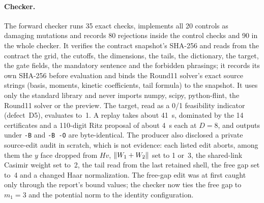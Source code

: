 \paragraph{Checker.}
The forward checker runs 35 exact checks, implements all 20 controls as
damaging mutations and records 80 rejections inside the control checks and
90 in the whole checker. It verifies the contract snapshot's SHA-256 and reads
from the contract the grid, the cutoffs, the dimensions, the tails, the
dictionary, the target, the gate fields, the mandatory sentence and the
forbidden phrasings; it records its own SHA-256 before evaluation and binds
the Round11 solver's exact source strings (basis, moments, kinetic
coefficients, tail formula) to the snapshot. It uses only the standard
library and never imports numpy, scipy, python-flint, the Round11 solver or
the preview. The target, read as a 0/1 feasibility indicator (defect~D5),
evaluates to~1. A replay takes about 41~s, dominated by the 14 certificates
and a 110-digit Ritz proposal of about 4~s each at $D=8$, and outputs under
\texttt{-B} and \texttt{-B -O} are byte-identical. The producer also disclosed
a private source-edit audit in scratch, which is not evidence: each listed
edit aborts, among them the $y$ face dropped from $Hv$,
$\left\lVert W_1+W_2\right\rVert$ set to 1 or~3, the shared-link Casimir weight set to~2, the
tail read from the last retained shell, the free gap set to~4 and a changed
Haar normalization. The free-gap edit was at first caught only through the
report's bound values; the checker now ties the free gap to $m_1=3$ and the
potential norm to the identity configuration.

